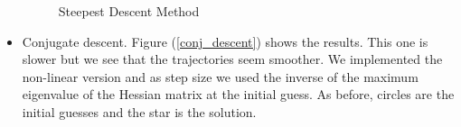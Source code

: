 \documentclass[a4paper,12pt]{article}
\begin{document}
\begin{itemize}
\begin{figure}[!htbp]
        \caption{Steepest Descent Method} 
        \label{steepest_des_fig}
    \end{figure}
        
        
        
        \item Conjugate descent. Figure (\ref{conj_descent}) shows the results. This one is slower but we see that the trajectories seem smoother. We implemented the non-linear version and as step size we used the inverse of the maximum eigenvalue of the Hessian matrix at the initial guess. As before, circles are the initial guesses and the star is the solution.   
        

\end{itemize}
\end{document}
